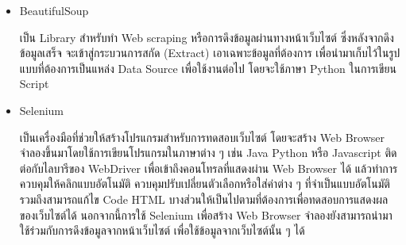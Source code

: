 \documentclass[12pt,oneside,openright,a4paper]{cpe-thai-project}
\begin{document}
\begin{itemize}
      \item BeautifulSoup

        \hspace{1cm}เป็น Library สำหรับทำ Web scraping หรือการดึงข้อมูลผ่านทางหน้าเว็บไซต์ ซึ่งหลังจากดึงข้อมูลเสร็จ จะเข้าสู่กระบวนการสกัด (Extract) 
        เอาเฉพาะข้อมูลที่ต้องการ เพื่อนำมาเก็บไว้ในรูปแบบที่ต้องการเป็นแหล่ง Data Source เพื่อใช้งานต่อไป โดยจะใช้ภาษา Python ในการเขียน Script \cite{beautifulsoup}

      \item Selenium 
      
        \hspace{1cm}เป็นเครื่องมือที่ช่วยให้สร้างโปรแกรมสำหรับการทดสอบเว็บไซต์ \cite{selenium} โดยจะสร้าง Web Browser จำลองขึ้นมาโดยใช้การเขียนโปรแกรมในภาษาต่าง ๆ
        เช่น Java Python หรือ Javascript ติดต่อกับไลบารีของ WebDriver เพื่อเข้าถึงคอนโทรลที่แสดงผ่าน Web Browser ได้
        แล้วทำการควบคุมให้คลิกแบบอัตโนมัติ ควบคุมปรับเปลี่ยนตัวเลือกหรือใส่ค่าต่าง ๆ ที่จำเป็นแบบอัตโนมัติ 
        รวมถึงสามารถแก้ไข Code HTML บางส่วนให้เป็นไปตามที่ต้องการเพื่อทดสอบการแสดงผลของเว็บไซต์ได้
        นอกจากนี้การใช้ Selenium เพื่อสร้าง Web Browser จำลองยังสามารถนำมาใช้ร่วมกับการดึงข้อมูลจากหน้าเว็บไซต์ เพื่อใช้ข้อมูลจากเว็บไซต์นั้น ๆ ได้
    \end{itemize}
\end{document}
